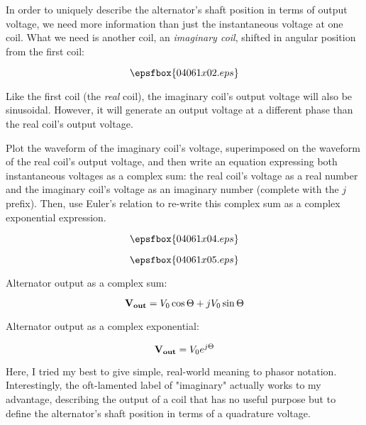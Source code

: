 In order to uniquely describe the alternator's shaft position in terms of output voltage, we need more information than just the instantaneous voltage at one coil.  What we need is another coil, an {\it imaginary coil}, shifted in angular position from the first coil:

$$\epsfbox{04061x02.eps}$$

Like the first coil (the {\it real} coil), the imaginary coil's output voltage will also be sinusoidal.  However, it will generate an output voltage at a different phase than the real coil's output voltage.

Plot the waveform of the imaginary coil's voltage, superimposed on the waveform of the real coil's output voltage, and then write an equation expressing both instantaneous voltages as a complex sum: the real coil's voltage as a real number and the imaginary coil's voltage as an imaginary number (complete with the $j$ prefix).  Then, use Euler's relation to re-write this complex sum as a complex exponential expression.

$$\epsfbox{04061x04.eps}$$







$$\epsfbox{04061x05.eps}$$

Alternator output as a complex sum:

$${\bf V_{out}} = V_0 \cos \Theta + j V_0 \sin \Theta$$

\vskip 10pt

Alternator output as a complex exponential:

$${\bf V_{out}} = V_0 e^{j \Theta}$$







Here, I tried my best to give simple, real-world meaning to phasor notation.  Interestingly, the oft-lamented label of "imaginary" actually works to my advantage, describing the output of a coil that has no useful purpose but to define the alternator's shaft position in terms of a quadrature voltage.




